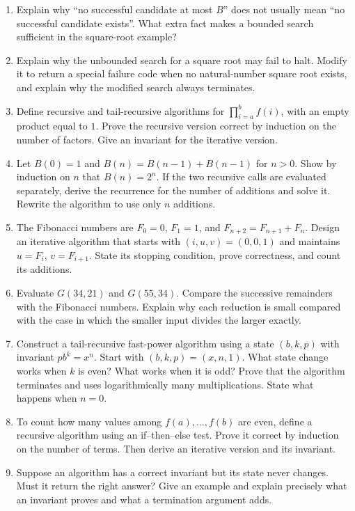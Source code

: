 \begin{enumerate}
cannot both exceed half the earlier second argument. Use this to derive
a logarithmic bound without assuming anything about Fibonacci numbers.
\item Explain why ``no successful candidate at most $B$'' does not usually
mean ``no successful candidate exists''. What extra fact makes a bounded
search sufficient in the square-root example?
\item Explain why the unbounded search for a square root may fail to halt.
Modify it to return a special failure code when no natural-number square root
exists, and explain why the modified search always terminates.
\item Define recursive and tail-recursive algorithms for
$\prod_{i=a}^{b}f(i)$, with an empty product equal to $1$. Prove the recursive
version correct by induction on the number of factors. Give an invariant
for the iterative version.
\item Let $B(0)=1$ and $B(n)=B(n-1)+B(n-1)$ for $n>0$. Show by induction
on $n$ that $B(n)=2^n$. If the two recursive calls are evaluated separately,
derive the recurrence for the number of additions and solve it. Rewrite the
algorithm to use only $n$ additions.
\item The Fibonacci numbers are $F_0=0$, $F_1=1$, and
$F_{n+2}=F_{n+1}+F_n$. Design an iterative algorithm that starts with
$(i,u,v)=(0,0,1)$ and maintains $u=F_i$, $v=F_{i+1}$. State its stopping
condition, prove correctness, and count its additions.
\item Evaluate $G(34,21)$ and $G(55,34)$. Compare the successive remainders
with the Fibonacci numbers. Explain why each reduction is small compared
with the case in which the smaller input divides the larger exactly.
\item Construct a tail-recursive fast-power algorithm using a state $(b,k,p)$
with invariant $p b^k=x^n$. Start with $(b,k,p)=(x,n,1)$.
What state change works when $k$ is even? What works when it is odd?
Prove that the algorithm terminates and uses logarithmically many
multiplications. State what happens when $n=0$.
\item To count how many values among $f(a),\ldots,f(b)$ are even, define a
recursive algorithm using an if--then--else test. Prove it correct by induction
on the number of terms. Then derive an iterative version and its invariant.
\item Suppose an algorithm has a correct invariant but its state never
changes. Must it return the right answer? Give an example and explain
precisely what an invariant proves and what a termination argument adds.
\end{enumerate}
